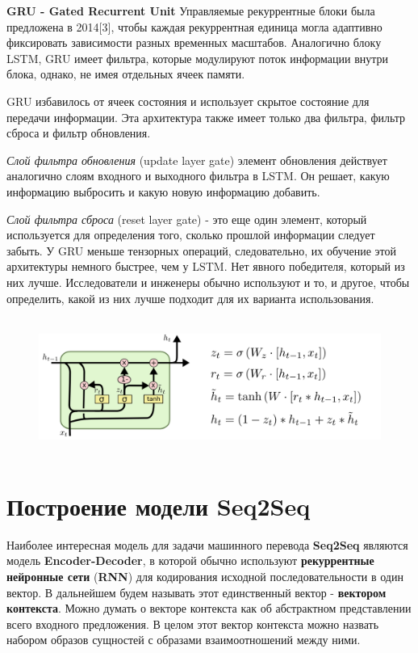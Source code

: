 	\textbf{GRU - Gated Recurrent Unit} Управляемые рекуррентные блоки была предложена в 2014[3], чтобы каждая рекуррентная единица могла адаптивно фиксировать зависимости разных временных масштабов. Аналогично блоку LSTM, GRU имеет
	фильтра, которые модулируют поток информации внутри блока, однако, не имея отдельных ячеек памяти.
	
    GRU избавилось от ячеек состояния и использует скрытое состояние для передачи информации. Эта архитектура также имеет только два фильтра, фильтр сброса и фильтр обновления.
    
    \textit{Слой фильтра обновления} (update layer gate) элемент обновления действует аналогично слоям входного и выходного фильтра в LSTM. Он решает, какую информацию выбросить и какую новую информацию добавить.
    
    \textit{Слой фильтра сброса} (reset layer gate) - это еще один элемент, который используется для определения того, сколько прошлой информации следует забыть.
    У GRU меньше тензорных операций, следовательно, их обучение этой архитектуры немного быстрее, чем у LSTM. Нет явного победителя, который из них лучше. Исследователи и инженеры обычно используют и то, и другое, чтобы определить, какой из них лучше подходит для их варианта использования.
    
    \begin{figure}[ht!]
		\centering
		\captionsetup{justification=centering}
		\includegraphics[height=45mm]{img/GRU.png}
	\end{figure}
	
	\clearpage
 	
 	\section{Построение модели Seq2Seq}
	
	Наиболее интересная модель для задачи машинного перевода \textbf{Seq2Seq} являются модель \textbf{Encoder-Decoder}, в которой обычно используют \textbf{рекуррентные нейронные сети} (\textbf{RNN}) для кодирования исходной последовательности в один вектор. В дальнейшем будем называть этот единственный вектор - \textbf{вектором контекста}. Можно думать о векторе контекста как об абстрактном представлении всего входного предложения. В целом этот вектор контекста можно назвать набором образов сущностей с образами взаимоотношений между ними. 

